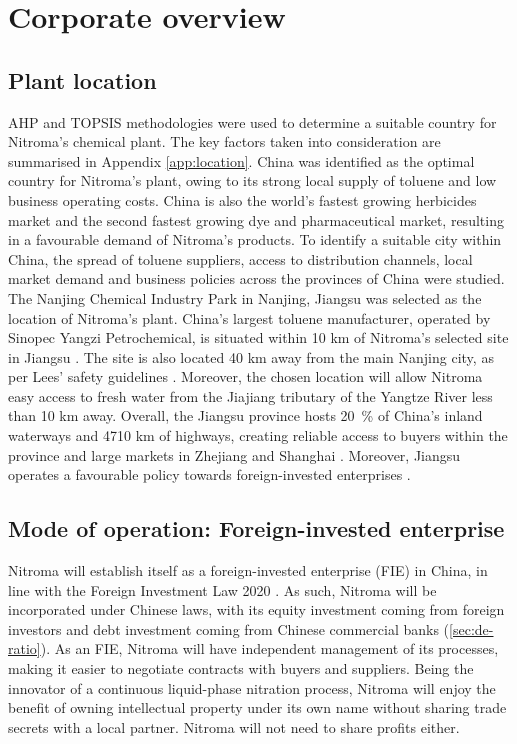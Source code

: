 \section{Corporate overview}
\subsection{Plant location}
\label{sec:location}
AHP and TOPSIS methodologies were used to determine a suitable country for Nitroma’s chemical plant. The key factors taken into consideration are summarised in Appendix \ref{app:location}. China was identified as the optimal country for Nitroma's plant, owing to its strong local supply of toluene and low business operating costs. China is also the world’s fastest growing herbicides market and the second fastest growing dye and pharmaceutical market, resulting in a favourable demand of Nitroma’s products. To identify a suitable city within China, the spread of toluene suppliers, access to distribution channels, local market demand and business policies across the provinces of China were studied. The Nanjing Chemical Industry Park in Nanjing, Jiangsu was selected as the location of Nitroma’s plant. China’s largest toluene manufacturer, operated by Sinopec Yangzi Petrochemical, is situated within 10 km of Nitroma’s selected site in Jiangsu \cite{sinopec_group_sinopec_2014}. The site is also located 40 km away from the main Nanjing city, as per Lees' safety guidelines \cite{lees_lees_2012}. Moreover, the chosen location will allow Nitroma easy access to fresh water from the Jiajiang tributary of the Yangtze River less than 10 km away. Overall, the Jiangsu province hosts \SI{20}{\percent} of China’s inland waterways and 4710 km of highways, creating reliable access to buyers within the province and large markets in Zhejiang and Shanghai \cite{britannica_jiangsu_nodate}. Moreover, Jiangsu operates a favourable policy towards foreign-invested enterprises \cite{hktdc_sourcing_market_2008}.

\subsection{Mode of operation: Foreign-invested enterprise}
\label{sec:mode-of-operation}
Nitroma will establish itself as a foreign-invested enterprise (FIE) in China, in line with the Foreign Investment Law 2020 \cite{jones_day_china_2020}. As such, Nitroma will be incorporated under Chinese laws, with its equity investment coming from foreign investors and debt investment coming from Chinese commercial banks (\ref{sec:de-ratio}). As an FIE, Nitroma will have independent management of its processes, making it easier to negotiate contracts with buyers and suppliers. Being the innovator of a continuous liquid-phase nitration process, Nitroma will enjoy the benefit of owning intellectual property under its own name without sharing trade secrets with a local partner. Nitroma will not need to share profits either. 

